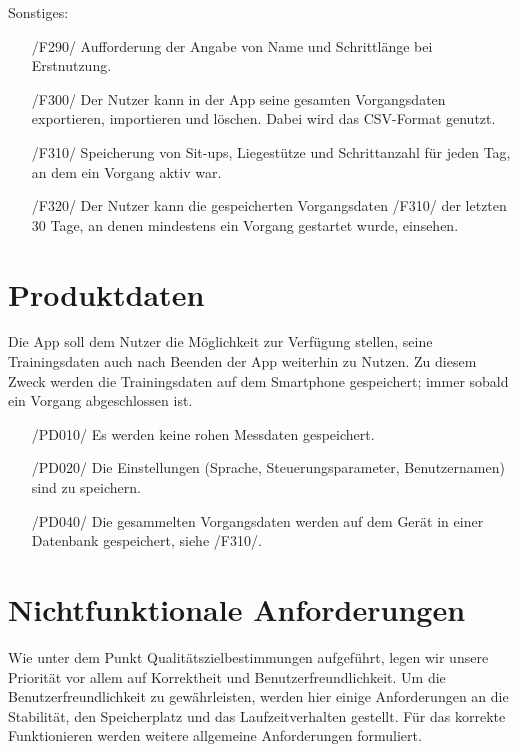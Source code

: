 \documentclass[a4paper,12pt]{article}
\begin{document}
		\textsf{Sonstiges:}
	\begin{itemize}
        \item[/F290/] Aufforderung der Angabe von Name und Schrittlänge bei Erstnutzung.
        \item[/F300/] Der Nutzer kann in der App seine gesamten \Gls{Vorgangsdaten} exportieren, importieren und löschen. Dabei wird das CSV-Format genutzt. 
        \item[/F310/] Speicherung von Sit-ups, Liegestütze und Schrittanzahl für jeden Tag, an dem ein \Gls{Vorgang} aktiv war.
        \item[/F320/] Der Nutzer kann die gespeicherten Vorgangsdaten /F310/ der letzten 30 Tage, an denen mindestens ein Vorgang gestartet wurde, einsehen. 
  
  
      \end{itemize}
\vspace{1cm}
\section{Produktdaten}
Die App soll dem Nutzer die Möglichkeit zur Verfügung stellen, seine Trainingsdaten auch nach Beenden der App weiterhin zu Nutzen. Zu diesem Zweck werden die Trainingsdaten auf dem Smartphone gespeichert; immer sobald ein Vorgang abgeschlossen ist.
\begin{itemize}
	\item[/PD010/] Es werden keine rohen Messdaten gespeichert.
	\item[/PD020/] Die Einstellungen (Sprache, \Gls{Steuerungsparameter}, Benutzernamen) sind zu speichern. 
	\item[/PD040/] Die gesammelten \Gls{Vorgangsdaten} werden auf dem Gerät in einer Datenbank gespeichert, siehe /F310/.
\end{itemize}

\vspace{1cm}
\section{Nichtfunktionale Anforderungen}
Wie unter dem Punkt Qualitätszielbestimmungen aufgeführt, legen wir unsere Priorität vor allem auf Korrektheit und Benutzerfreundlichkeit. Um die Benutzerfreundlichkeit zu gewährleisten, werden hier einige Anforderungen an die Stabilität, den Speicherplatz und das Laufzeitverhalten gestellt. Für das korrekte Funktionieren werden weitere allgemeine Anforderungen formuliert.
\end{document}
